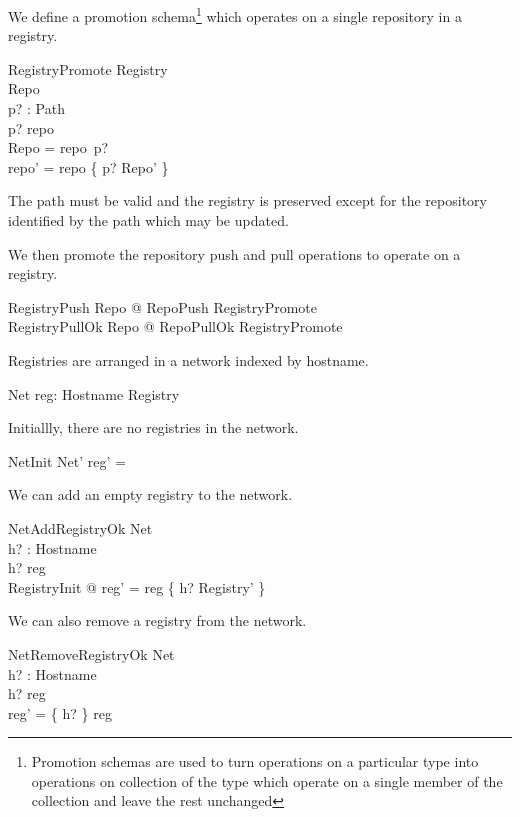 \documentclass[a4paper,twoside,12pt]{article}
\begin{document}
\begin{samepage}
We define a promotion schema\footnote{Promotion schemas are used to turn operations on a particular type into operations on collection of the type which operate on a single member of the collection and leave the rest unchanged} which operates on a single repository in a registry.
\begin{schema}{RegistryPromote}
  \Delta Registry \\
  \Delta Repo \\
  p? : Path \\
\where
  p? \in \dom repo \\
  \theta Repo = repo~p? \\
  repo' = repo \oplus \{ p? \mapsto \theta Repo' \} \\
\end{schema}
The path must be valid and the registry is preserved except for the repository identified by the path which may be updated.
\end{samepage}

We then promote the repository push and pull operations to operate on a registry.
\begin{zed}
  RegistryPush  \exists \Delta Repo @ RepoPush \land RegistryPromote \\
  RegistryPullOk  \exists \Delta Repo @ RepoPullOk \land RegistryPromote \\
\end{zed}
  
Registries are arranged in a network indexed by hostname.
\begin{schema}{Net}
    reg: Hostname \pfun Registry \\
\end{schema}

Initiallly, there are no registries in the network.
\begin{schema}{NetInit}
  Net'
\where
  reg' = \emptyset
\end{schema}

We can add an empty registry to the network.
\begin{schema}{NetAddRegistryOk}
  \Delta Net \\
  h? : Hostname \\
\where
  h? \notin \dom reg \\
  \exists RegistryInit @ reg' = reg \cup \{ h? \mapsto \theta Registry' \} \\
\end{schema}

We can also remove a registry from the network.
\begin{schema}{NetRemoveRegistryOk}
  \Delta Net \\
  h? : Hostname \\
\where
  h? \in \dom reg \\
  reg' = \{ h? \} \ndres reg \\
\end{schema}
\end{document}
